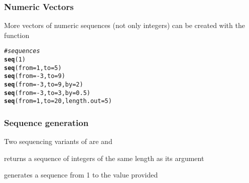 \documentclass[12pt]{beamer}\usepackage[]{graphicx}\usepackage[]{color}
\makeatletter
\newcommand{\hlnum}[1]{\textcolor[rgb]{0.686,0.059,0.569}{#1}}%
\newcommand{\hlcom}[1]{\textcolor[rgb]{0.678,0.584,0.686}{\textit{#1}}}%
\newcommand{\hlopt}[1]{\textcolor[rgb]{0,0,0}{#1}}%
\newcommand{\hlstd}[1]{\textcolor[rgb]{0.345,0.345,0.345}{#1}}%
\newcommand{\hlkwc}[1]{\textcolor[rgb]{0.333,0.667,0.333}{#1}}%
\newcommand{\hlkwd}[1]{\textcolor[rgb]{0.737,0.353,0.396}{\textbf{#1}}}%
\newenvironment{kframe}{%
 \def\at@end@of@kframe{}%
 \ifinner\ifhmode%
  \def\at@end@of@kframe{\end{minipage}}%
  \begin{minipage}{\columnwidth}%
 \fi\fi%
 \def\FrameCommand##1{\hskip\@totalleftmargin \hskip-\fboxsep
 \colorbox{shadecolor}{##1}\hskip-\fboxsep
     \hskip-\linewidth \hskip-\@totalleftmargin \hskip\columnwidth}%
 \MakeFramed {\advance\hsize-\width
   \@totalleftmargin\z@ \linewidth\hsize
   \@setminipage}}%
 {\par\unskip\endMakeFramed%
 \at@end@of@kframe}
\newenvironment{knitrout}{}{} %
\makeatother
\begin{document}

\begin{frame}[fragile]
\frametitle{Numeric Vectors}

More vectors of numeric sequences (not only integers) can be created with the function {\hilit {}}
\begin{knitrout}\footnotesize
{}\color{fgcolor}\begin{kframe}
\begin{alltt}
\hlcom{# sequences}
\hlkwd{seq}\hlstd{(}\hlnum{1}\hlstd{)}
\hlkwd{seq}\hlstd{(}\hlkwc{from} \hlstd{=} \hlnum{1}\hlstd{,} \hlkwc{to} \hlstd{=} \hlnum{5}\hlstd{)}
\hlkwd{seq}\hlstd{(}\hlkwc{from} \hlstd{=} \hlopt{-}\hlnum{3}\hlstd{,} \hlkwc{to} \hlstd{=} \hlnum{9}\hlstd{)}
\hlkwd{seq}\hlstd{(}\hlkwc{from} \hlstd{=} \hlopt{-}\hlnum{3}\hlstd{,} \hlkwc{to} \hlstd{=} \hlnum{9}\hlstd{,} \hlkwc{by} \hlstd{=} \hlnum{2}\hlstd{)}
\hlkwd{seq}\hlstd{(}\hlkwc{from} \hlstd{=} \hlopt{-}\hlnum{3}\hlstd{,} \hlkwc{to} \hlstd{=} \hlnum{3}\hlstd{,} \hlkwc{by} \hlstd{=} \hlnum{0.5}\hlstd{)}
\hlkwd{seq}\hlstd{(}\hlkwc{from} \hlstd{=} \hlnum{1}\hlstd{,} \hlkwc{to} \hlstd{=} \hlnum{20}\hlstd{,} \hlkwc{length.out} \hlstd{=} \hlnum{5}\hlstd{)}
\end{alltt}
\end{kframe}
\end{knitrout}

\end{frame}


\begin{frame}[fragile]
\frametitle{Sequence generation}

Two sequencing variants of  are  and 
\bi
  \item {} returns a sequence of integers of the same length as its argument
  \item {} generates a sequence from 1 to the value provided
\ei

\end{frame}

\end{document}
